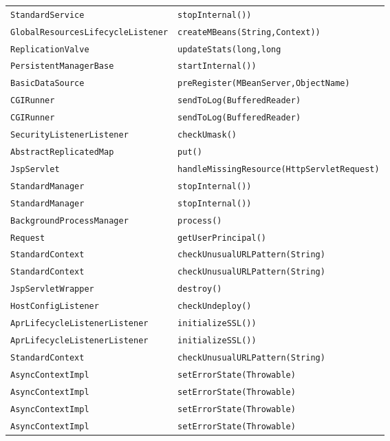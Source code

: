 \begin{center}
\begin{longtable}{ll}
\lstinline/StandardService/&{\lstinline/stopInternal())/}\\
\lstinline/GlobalResourcesLifecycleListener/&{\lstinline/createMBeans(String,Context))/}\\
\lstinline/ReplicationValve/&{\lstinline/updateStats(long,long/}\\
\lstinline/PersistentManagerBase/&{\lstinline/startInternal())/}\\
\lstinline/BasicDataSource/&{\lstinline/preRegister(MBeanServer,ObjectName)/}\\
\lstinline/CGIRunner/&{\lstinline/sendToLog(BufferedReader)/}\\
\lstinline/CGIRunner/&{\lstinline/sendToLog(BufferedReader)/}\\
\lstinline/SecurityListenerListener/&{\lstinline/checkUmask()/}\\
\lstinline/AbstractReplicatedMap/&{\lstinline/put()/}\\
\lstinline/JspServlet/&{\lstinline/handleMissingResource(HttpServletRequest)/}\\
\lstinline/StandardManager/&{\lstinline/stopInternal())/}\\
\lstinline/StandardManager/&{\lstinline/stopInternal())/}\\
\lstinline/BackgroundProcessManager/&{\lstinline/process()/}\\
\lstinline/Request/&{\lstinline/getUserPrincipal()/}\\
\lstinline/StandardContext/&{\lstinline/checkUnusualURLPattern(String)/}\\
\lstinline/StandardContext/&{\lstinline/checkUnusualURLPattern(String)/}\\
\lstinline/JspServletWrapper/&{\lstinline/destroy()/}\\
\lstinline/HostConfigListener/&{\lstinline/checkUndeploy()/}\\
\lstinline/AprLifecycleListenerListener/&{\lstinline/initializeSSL())/}\\
\lstinline/AprLifecycleListenerListener/&{\lstinline/initializeSSL())/}\\
\lstinline/StandardContext/&{\lstinline/checkUnusualURLPattern(String)/}\\
\lstinline/AsyncContextImpl/&{\lstinline/setErrorState(Throwable)/}\\
\lstinline/AsyncContextImpl/&{\lstinline/setErrorState(Throwable)/}\\
\lstinline/AsyncContextImpl/&{\lstinline/setErrorState(Throwable)/}\\
\lstinline/AsyncContextImpl/&{\lstinline/setErrorState(Throwable)/}\\

\end{longtable}
\end{center}
